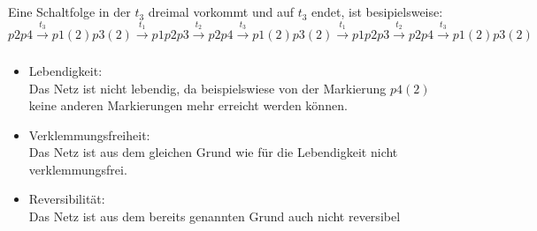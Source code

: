 \documentclass[a4paper,12pt]{scrartcl}
\title{\blatt}
\date{Gruppe 07}
\author{Sabrina Buczko 6663234, Julian Deinert 6535880, Rafael Heid 6704828}
\begin{document}
\maketitle
\newpage
\setcounter{section}{6}
\section{}
\setcounter{subsection}{2}
\subsection{}
\subsubsection{}
\subsubsection{}
Eine Schaltfolge in der $t_3$ dreimal vorkommt und auf $t_3$ endet, ist besipielsweise:\\
\begin{math}
p2p4 \xrightarrow{t_3} 
p1(2)p3(2) \xrightarrow{t_1} 
p1p2p3 \xrightarrow{t_2} 
p2p4 \xrightarrow{t_3} 
p1(2)p3(2) \xrightarrow{t_1} 
p1p2p3 \xrightarrow{t_2} 
p2p4 \xrightarrow{t_3} 
p1(2)p3(2)
\end{math}
\subsubsection{}
\begin{itemize}
	\item{Lebendigkeit:}\\
		Das Netz ist nicht lebendig, da beispielswiese von 
		der Markierung $p4(2)$ keine anderen Markierungen 
		mehr erreicht werden können.
	\item{Verklemmungsfreiheit:}\\
		Das Netz ist aus dem gleichen Grund wie für die 
		Lebendigkeit nicht verklemmungsfrei.
	\item{Reversibilität:}\\
		Das Netz ist aus dem bereits genannten Grund auch 
		nicht reversibel

\end{itemize}
\end{document}

